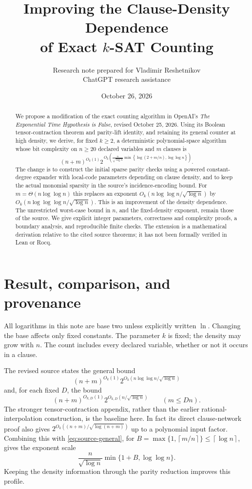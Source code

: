 \documentclass[11pt]{article}
\title{Improving the Clause-Density Dependence\protect\\of Exact $k$-SAT Counting}
\author{Research note prepared for Vladimir Reshetnikov\smallskip\\\small ChatGPT research assistance}
\date{October 26, 2026}
\numberwithin{equation}{section}
\theoremstyle{definition}\newtheorem{definition}[theorem]{Definition}
\theoremstyle{remark}\newtheorem{remark}[theorem]{Remark}
\newcommand{\ceil}[1]{\left\lceil#1\right\rceil}
\begin{document}
\maketitle
\begin{abstract}
We propose a modification of the exact counting algorithm in OpenAI's
\emph{The Exponential Time Hypothesis is False}, revised October 25, 2026.
Using its Boolean tensor-contraction theorem and parity-lift identity,
and retaining its general counter at high density, we derive, for
fixed $k\ge2$, a deterministic polynomial-space algorithm
whose bit complexity on $n\ge20$ declared variables and $m$ clauses is
\[
 (n+m)^{O_k(1)}
 2^{\,O_k\!\left(\frac{n}{\sqrt{\log n}}
       \min\left\{\log(2+m/n),\log\log n\right\}\right)}.
\]
The change is to construct the initial sparse parity checks using a
powered constant-degree expander with local-code parameters depending
on clause density, and to keep the actual monomial sparsity in the
source's incidence-encoding bound. For $m=\Theta(n\log\log n)$ this
replaces an exponent $O_k(n\log\log n/\sqrt{\log n})$ by
$O_k(n\log\log\log n/\sqrt{\log n})$.
This is an improvement of the density dependence. The unrestricted
worst-case bound in $n$, and the fixed-density exponent, remain those
of the source. We give explicit integer parameters, correctness and
complexity proofs, a boundary analysis, and reproducible finite checks.
The extension is a mathematical derivation relative to the cited
source theorems; it has not been formally verified in Lean or Rocq.
\end{abstract}
\tableofcontents
\clearpage

\section{Result, comparison, and provenance}
\label{sec:result}

All logarithms in this note are base two unless explicitly written
$\ln$. Changing the base affects only fixed constants. The parameter
$k$ is fixed; the density may grow with $n$. The count includes every
declared variable, whether or not it occurs in a clause.

The revised source \cite{OAI2026} states the general bound
\begin{equation}\label{eq:source-general}
 (n+m)^{O_k(1)}2^{O_k(n\log\log n/\sqrt{\log n})}
\end{equation}
and, for each fixed $D$, the bound
\begin{equation}\label{eq:source-sparse}
 (n+m)^{O_{k,D}(1)}2^{O_{k,D}(n/\sqrt{\log n})}
 \qquad(m\le Dn).
\end{equation}
The stronger tensor-contraction appendix, rather than the earlier
rational-interpolation construction, is the baseline here. In fact its
direct clause-network proof also gives
$2^{O_k((n+m)/\sqrt{\log(n+m)})}$ up to a polynomial input factor.
Combining this with \eqref{eq:source-general}, for
$B=\max\{1,\ceil{m/n}\}\le\ceil{\log n}$, gives the exponent scale
\begin{equation}\label{eq:old-profile}
 \frac{n}{\sqrt{\log n}}\min\{1+B,\log\log n\}.
\end{equation}
Keeping the density information through the parity reduction improves
this profile.
\end{document}
